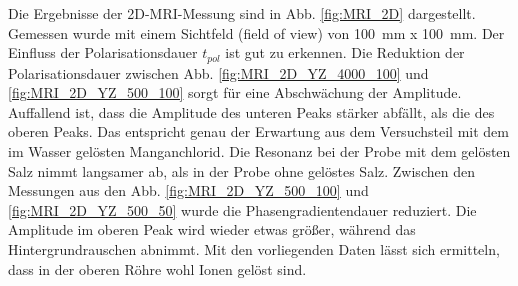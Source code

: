 \documentclass[../../main.tex]{subfiles}
\begin{document}
        Die Ergebnisse der 2D-MRI-Messung sind in Abb. \ref{fig:MRI_2D} dargestellt. Gemessen wurde mit einem Sichtfeld (field of view) von \SI{100}{\milli \metre} x \SI{100}{\milli \metre}. Der Einfluss der Polarisationsdauer $t_{pol}$ ist gut zu erkennen. Die Reduktion der Polarisationsdauer zwischen Abb. \ref{fig:MRI_2D_YZ_4000_100} und \ref{fig:MRI_2D_YZ_500_100} sorgt für eine Abschwächung der Amplitude. Auffallend ist, dass die Amplitude des unteren Peaks stärker abfällt, als die des oberen Peaks. Das entspricht genau der Erwartung aus dem Versuchsteil mit dem im Wasser gelösten Manganchlorid. Die Resonanz bei der Probe mit dem gelösten Salz nimmt langsamer ab, als in der Probe ohne gelöstes Salz. Zwischen den Messungen aus den Abb. \ref{fig:MRI_2D_YZ_500_100} und \ref{fig:MRI_2D_YZ_500_50} wurde die Phasengradientendauer reduziert. Die Amplitude im oberen Peak wird wieder etwas größer, während das Hintergrundrauschen abnimmt. Mit den vorliegenden Daten lässt sich ermitteln, dass in der oberen Röhre wohl Ionen gelöst sind. 
\end{document}
